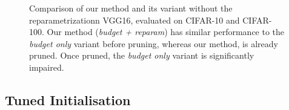 \begin{figure}
  \centering
  \caption{Comparison of our method and its variant without the
    reparametrizationn VGG16, evaluated on CIFAR-10 and CIFAR-100. Our method
    (\emph{budget + reparam}) has similar performance to the \emph{budget only}
    variant before pruning, whereas our method, is already pruned. Once pruned,
    the \emph{budget only} variant is significantly impaired.}
  \label{fig:chap1:budget_only_vgg16}
\end{figure}



\subsection{Tuned Initialisation}\label{sec:chap1:impact_of_fine_tuning}



